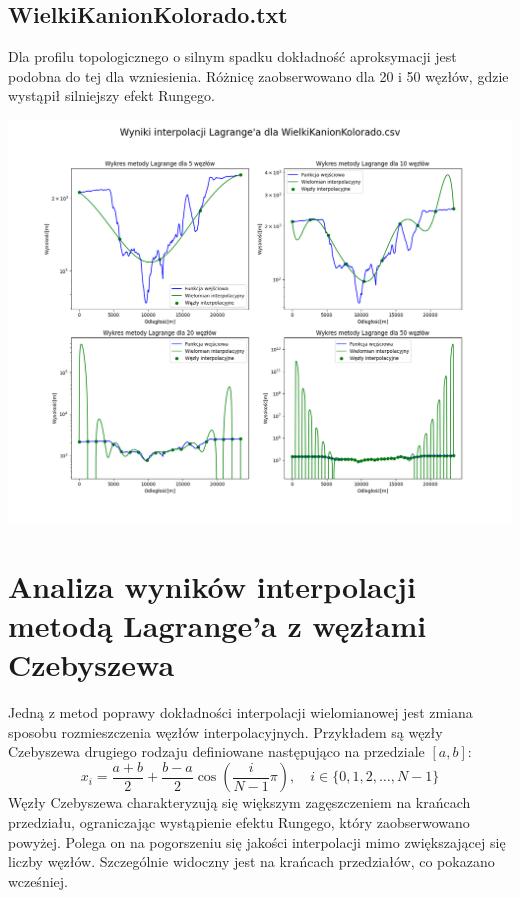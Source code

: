 \documentclass[a4paper,12pt]{article}
\begin{document}
	\subsection{WielkiKanionKolorado.txt}
	Dla profilu topologicznego o silnym spadku dokładność aproksymacji jest podobna do tej dla wzniesienia. Różnicę zaobserwowano dla 20 i 50 węzłów, gdzie wystąpił silniejszy efekt Rungego.
	\begin{center}
        \includegraphics[scale=0.4]{../charts/lagrange_WielkiKanionKolorado.png}
    \end{center}
    
\newpage   
\section{Analiza wyników interpolacji metodą Lagrange'a z węzłami Czebyszewa}
	Jedną z metod poprawy dokładności interpolacji wielomianowej jest zmiana sposobu rozmieszczenia węzłów interpolacyjnych. Przykładem są węzły Czebyszewa drugiego rodzaju definiowane następująco na przedziale $[a, b]$:
	\begin{equation}
	x_i = \frac{a+b}{2} + \frac{b-a}{2}\cos(\frac{i}{N-1}\pi), \quad i \in \{0, 1, 2, \dots, N-1\}
	\end{equation}
	Węzły Czebyszewa charakteryzują się większym zagęszczeniem na krańcach przedziału, ograniczając wystąpienie efektu Rungego, który zaobserwowano powyżej. Polega on na pogorszeniu się jakości interpolacji mimo zwiększającej się liczby węzłów. Szczególnie widoczny jest na krańcach przedziałów, co pokazano wcześniej.
	
\end{document}
